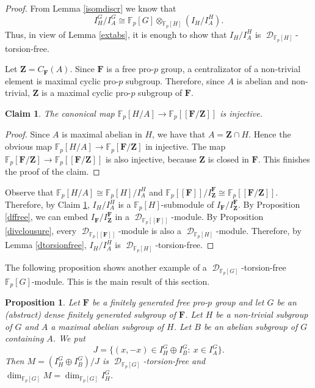 \documentclass[11pt]{amsart}
\newtheorem{pro}[lem]{Proposition}
\newtheorem{claim}[lem]{Claim}
\numberwithin{claimcounter}{lem}
\DeclareMathOperator{\D}{\mathcal D}
\newcommand{\F}{\mathbb{F}}
\begin{document}
\begin{proof}
From Lemma \ref{isomdiscr} we know that
 $$I^G_H/I^G_A\cong \F_p[G]\otimes_{\F_p[H]} (I_H/I^H_A).$$
Thus, in view of Lemma \ref{extabs}, it is enough  to show that $I_H/I^H_A$ is $\D_{\F_p[H]}$-torsion-free. 

Let $\mathbf Z=C_{\mathbf F} (A)$. Since $\mathbf F$ is a free pro-$p$ group, a centralizator of a non-trivial element is  maximal cyclic pro-$p$ subgroup. Therefore, since $A$ is abelian and non-trivial, $\mathbf Z$ is a maximal cyclic pro-$p$ subgroup of $\mathbf F$.
\begin{claim}\label{emb}
The canonical map $\F_p[H/A]\to \F_p[[\mathbf F/ \mathbf Z]]$ is injective. 
\end{claim}
\begin{proof}
 
Since $A$ is maximal abelian in $H$, we have that $A=\mathbf Z\cap H$. Hence the obvious map $\F_p[H/A]\to \F_p[\mathbf F/ \mathbf Z]$ in injective. The map  $\F_p[\mathbf F/ \mathbf Z]\to \F_p[[\mathbf F/ \mathbf Z]]$ is also injective, because $\mathbf Z$ is closed in $\mathbf F$. This finishes the proof of the claim.\end{proof}
Observe that  $\F_p[H/A]\cong \F_p[H]/I_A^H$ and $\F_p[[\mathbf F]]/I_\mathbf Z^{\mathbf F}\cong \F_p[[\mathbf F/ \mathbf Z]]$. 
Therefore,  by Claim \ref{emb}, $I_H/I^H_A$ is a $\F_p[H]$-submodule of $I_{\mathbf F}/I_\mathbf Z^{\mathbf F}$. By Proposition \ref{dffree}, we can embed $I_{\mathbf F}/I_\mathbf Z^{\mathbf F}$ in a $\D_{\F_p[[\mathbf F]]}$-module. By Proposition \ref{divclousure}, every $\D_{\F_p[[\mathbf F]]}$-module is also a $\D_{\F_p[H]}$-module. Therefore, by Lemma \ref{dtorsionfree},   $I_H/I^H_A$ is $\D_{\F_p[H]}$-torsion-free.
\end{proof}
  The following proposition shows   another  example of a $\D_{\F_p[G]}$-torsion-free $\F_p[G]$-module. This is the main result of this section.
\begin{pro}  \label{dfpfree} Let $\mathbf F$ be a finitely generated free pro-$p$ group and let $G$ be an (abstract) dense finitely generated  subgroup of $\mathbf F$.  Let $H$ be a non-trivial subgroup of $G$ and $A$ a maximal abelian subgroup of $H$. Let $B$ be an abelian subgroup of $G$ containing $A$. We put  $$J=\{(x,-x)\in I^G_H\oplus I^G_B:\ x\in I^G_A\}.$$ Then $M=(I^G_H\oplus I^G_B)/J$ is $\D_{\F_p[G]}$-torsion-free and $\dim_{\F_p[G]}M=\dim_{\F_p[G]}I^G_H$.
\end{pro}
\end{document}
